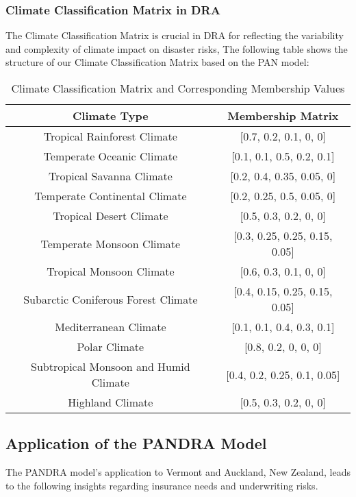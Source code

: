 \documentclass{mcmthesis}
\begin{document}
\subsubsection{Climate Classification Matrix in DRA}
The Climate Classification Matrix is crucial in DRA for reflecting the variability and complexity of climate impact on disaster risks, The following table shows the structure of our Climate Classification Matrix based on the PAN model:
\begin{table}[h]
\centering
\caption{Climate Classification Matrix and Corresponding Membership Values}
\begin{tabular}{|c|c|}
\hline
\textbf{Climate Type} & \textbf{Membership Matrix} \\
\hline
Tropical Rainforest Climate & [0.7, 0.2, 0.1, 0, 0] \\
\hline
Temperate Oceanic Climate & [0.1, 0.1, 0.5, 0.2, 0.1] \\
\hline
Tropical Savanna Climate & [0.2, 0.4, 0.35, 0.05, 0] \\
\hline
Temperate Continental Climate & [0.2, 0.25, 0.5, 0.05, 0] \\
\hline
Tropical Desert Climate & [0.5, 0.3, 0.2, 0, 0] \\
\hline
Temperate Monsoon Climate & [0.3, 0.25, 0.25, 0.15, 0.05] \\
\hline
Tropical Monsoon Climate & [0.6, 0.3, 0.1, 0, 0] \\
\hline
Subarctic Coniferous Forest Climate & [0.4, 0.15, 0.25, 0.15, 0.05] \\
\hline
Mediterranean Climate & [0.1, 0.1, 0.4, 0.3, 0.1] \\
\hline
Polar Climate & [0.8, 0.2, 0, 0, 0] \\
\hline
Subtropical Monsoon and Humid Climate & [0.4, 0.2, 0.25, 0.1, 0.05] \\
\hline
Highland Climate & [0.5, 0.3, 0.2, 0, 0] \\
\hline
\end{tabular}
\label{table:ClimateClassificationMatrix}

\end{table}

\subsection{Application of the PANDRA Model}
The PANDRA model's application to Vermont and Auckland, New Zealand, leads to the following insights regarding insurance needs and underwriting risks.
\end{document}
